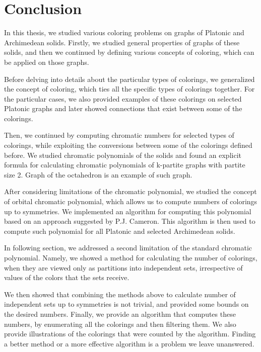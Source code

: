 \chapter*{Conclusion}

In this thesis, we studied various coloring problems on graphs of Platonic and Archimedean solids. Firstly, we studied general properties of graphs of these solids, and then we continued by defining various concepts of coloring, which can be applied on those graphs.

Before delving into details about the particular types of colorings, we generalized the concept of coloring, which ties all the specific types of colorings together. For the particular cases, we also provided examples of these colorings on selected Platonic graphs and later showed connections that exist between some of the colorings.

Then, we continued by computing chromatic numbers for selected types of colorings, while exploiting the conversions between some of the colorings defined before. We studied chromatic polynomials of the solids and found an explicit formula for calculating chromatic polynomials of k-partite graphs with partite size 2. Graph of the octahedron is an example of such graph.

After considering limitations of the chromatic polynomial, we studied the concept of orbital chromatic polynomial, which allows us to compute numbers of colorings up to symmetries. We implemented an algorithm for computing this polynomial based on an approach suggested by P.J. Cameron. This algorithm is then used to compute such polynomial for all Platonic and selected Archimedean solids.

In following section, we addressed a second limitation of the standard chromatic polynomial. Namely, we showed a method for calculating the number of colorings, when they are viewed only as partitions into independent sets, irrespective of values of the colors that the sets receive.

We then showed that combining the methods above to calculate number of independent sets up to symmetries is not trivial, and provided some bounds on the desired numbers. Finally, we provide an algorithm that computes these numbers, by enumerating all the colorings and then filtering them. We also provide illustrations of the colorings that were counted by the algorithm. Finding a better method or a more effective algorithm is a problem we leave unanswered.

